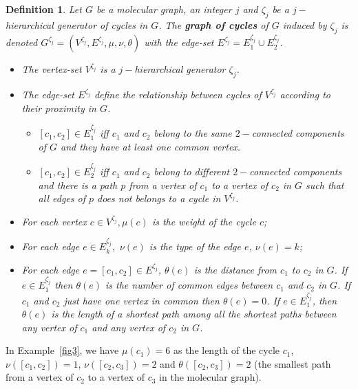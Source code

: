 \documentclass[10pt,letterpaper]{article}
\newtheorem{definition}{Definition}
\begin{document}
\begin{definition}
\label{graphcyclesdefinition}
Let $G$ be  a molecular graph, an integer $j$ and $\zeta_j$  be a $j-$hierarchical generator of cycles in $G$. The \textbf{graph of cycles} of $G$ induced by $\zeta_j$ is denoted $G^{\zeta_j} = (V^{\zeta_j},E^{\zeta_j},\mu,\nu,\theta)$ with the edge-set $E^{\zeta_j} = E^{\zeta_j}_{1} \cup E^{\zeta_j}_{2}$.

 \begin{itemize}
 
 	\item The vertex-set $V^{\zeta_j}$ is a $j-$hierarchical generator $\zeta_j$.
 	\item The edge-set $E^{\zeta_j}$ define the relationship between cycles of  $V^{\zeta_j}$ according to their proximity in $G$.
 	\begin{itemize}
 		\item $[c_1,c_2] \in E^{\zeta_j}_{1}$ iff $c_1$ and $c_2$ belong to the same $2-$connected components of $G$ and they have at least one common vertex.
 		\item $[c_1,c_2] \in E^{\zeta_j}_{2}$ iff  $c_1$ and $c_2$ belong to different  $2-$connected components and there is a path $p$ from a vertex of $c_1$ to a vertex of $c_2$ in $G$ such that all edges of $p$ does not belongs to a cycle in $V^{\zeta_j}$.
 	\end{itemize}
 	\item For each vertex $c \in V^{\zeta_j}, \mu(c)$ is the weight of the cycle $c$;
 	\item For each edge $e \in E^{\zeta_j}_k,$ $\nu(e)$ is the type of the edge $e$, $\nu(e)= k$;
 	\item For each edge $e= [c_1,c_2]  \in E^{\zeta_j}$, $\theta(e)$ is the distance from $c_1$ to $c_2$ in $G$. If $e \in E^{\zeta_j}_{1}$ then $\theta(e)$ is the number of common edges between $c_1$ and $c_2$ in $G$. If $c_1$ and $c_2$ just have one vertex in common then $\theta(e) = 0$. If $e \in E^{\zeta_j}_{1}$, then $\theta(e)$ is the length of a shortest path among all the shortest paths between any vertex of $c_1$ and any vertex of $c_2$ in $G$.
 \end{itemize}
\end{definition}

In Example~\ref{fig3}, we have $\mu(c_1) = 6$ as the length of the cycle $c_1$, $\nu([c_1,c_2]) = 1$, $ \nu([c_2,c_3]) = 2$ and $\theta([c_2,c_3]) = 2$ (the smallest path from a vertex of $c_2$ to a vertex of $c_3$ in the molecular graph).
\end{document}
